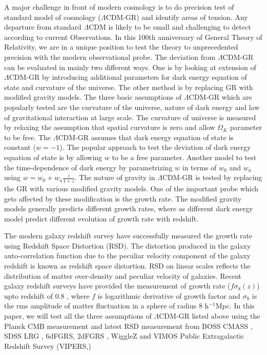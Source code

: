 A major challenge in front of modern cosmology is to do precision test of standard model of cosmology ($\Lambda$CDM-GR) and identify areas of tension. Any departure from standard $\Lambda$CDM is likely to be small and challenging to detect according to current Observations. In this 100th anniversary of General Theory of Relativity, we are in a unique position to test the theory to unprecedented precision with the modern observational probe. The deviation from $\Lambda$CDM-GR can be evaluated in mainly two different ways. One is by looking at extension of $\Lambda$CDM-GR by introducing additional parameters for dark energy equation of state and curvature of the universe. The other method is by replacing GR with modified gravity models. The three basic assumptions of $\Lambda$CDM-GR which are popularly tested are the curvature of the universe, nature of dark energy and law of gravitational interaction at large scale. The curvature of universe is measured by relaxing the assumption that spatial curvature is zero and allow $\Omega_K$  parameter to be free. The $\Lambda$CDM-GR assumes that dark energy equation of state is constant ($w=-1$). The popular approach to test the deviation of dark energy equation of state is by allowing $w$ to be a free parameter. Another model to test the time-dependence of dark energy by parametrizing $w$ in terms of $w_0$ and $w_a$  using $w=w_0 + w_a \frac{z}{1+z}$. The nature of gravity in $\Lambda$CDM-GR is tested by replacing the GR with various modified gravity models. One of the important probe which gets affected by these modification is the growth rate. The modified gravity models generally predicts different growth rates, where as different dark energy model predict different evolution of growth rate with redshift.

The modern galaxy redshift survey have successfully measured the growth rate using Redshift Space Distortion (RSD). The distortion produced in the galaxy auto-correlation function due to the peculiar velocity component of the galaxy redshift is known as redshift space distortion. RSD on linear scales reflects the distribution of matter over-density and peculiar velocity of galaxies. Recent galaxy redshift surveys have provided the measurement of growth rate ($f\sigma_8(z)$) upto redshift of $0.8$ , where $f$ is logarithmic derivative of growth factor and $\sigma_8$ is the rms amplitude of matter fluctuation in a sphere of radius 8 h$^{-1}$Mpc. In this paper, we will test all the three assumptions of $\Lambda$CDM-GR listed above using the Planck CMB measurement \citep{Planck2013} and latest RSD measurement  from BOSS CMASS \citep{Alam2015},  SDSS LRG \citep{SDSSLRG2012}, 6dFGRS\citep{6dFGRS}, 2dFGRS  \citep{2dFGRS}, WiggleZ \citep{Blake2011} and VIMOS Public Extragalactic Redshift Survey (VIPERS,\cite{Vipers})
